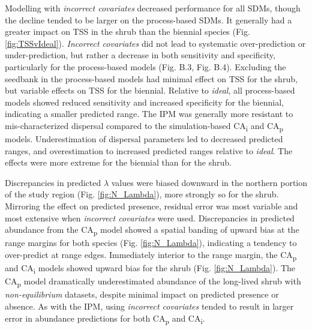 \documentclass[preprint,review,times,12pt]{elsarticle}
\begin{document}
Modelling with \emph{incorrect covariates} decreased performance for all SDMs, though the decline tended to be larger on the process-based SDMs. It generally had a greater impact on TSS in the shrub than the biennial species (Fig. \ref{fig:TSSvIdeal}). \emph{Incorrect covariates} did not lead to systematic over-prediction or under-prediction, but rather a decrease in both sensitivity and specificity, particularly for the process-based models (Fig. B.3, Fig. B.4). Excluding the seedbank in the process-based models had minimal effect on TSS for the shrub, but variable effects on TSS for the biennial. Relative to \emph{ideal}, all process-based models showed reduced sensitivity and increased specificity for the biennial, indicating a smaller predicted range. The IPM was generally more resistant to mis-characterized dispersal compared to the simulation-based CA\textsubscript{i} and CA\textsubscript{p} models. Underestimation of dispersal parameters led to decreased predicted ranges, and overestimation to increased predicted ranges relative to \emph{ideal}. The effects were more extreme for the biennial than for the shrub.

Discrepancies in predicted $\lambda$ values were biased downward in the northern portion of the study region (Fig. \ref{fig:N_Lambda}), more strongly so for the shrub. Mirroring the effect on predicted presence, residual error was most variable and most extensive when \emph{incorrect covariates} were used. Discrepancies in predicted abundance from the CA\textsubscript{p} model showed a spatial banding of upward bias at the range margins for both species (Fig. \ref{fig:N_Lambda}), indicating a tendency to over-predict at range edges. Immediately interior to the range margin, the CA\textsubscript{p} and CA\textsubscript{i} models showed upward bias for the shrub (Fig. \ref{fig:N_Lambda}). The CA\textsubscript{p} model dramatically underestimated abundance of the long-lived shrub with \emph{non-equilibrium} datasets, despite minimal impact on predicted presence or absence. As with the IPM, using \emph{incorrect covariates} tended to result in larger error in abundance predictions for both CA\textsubscript{p} and CA\textsubscript{i}.
\end{document}

